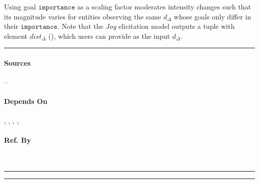 Using goal $\mathtt{importance}$ as a scaling factor moderates intensity
changes such that its magnitude varies for entities observing the same
$d_\Delta$ whose goals only differ in their $\mathtt{importance}$. Note that
the \textit{Joy} elicitation model outputs a tuple with element
$\mathit{dist}_\Delta$ (), which users can provide as the
input $d_\Delta$. \\\hrule

\paragraph{Sources} --

\paragraph{Depends On} ,
, ,
, 

\paragraph{Ref. By}  \\\hrule\vspace{0.5mm}\hrule

~\newline

